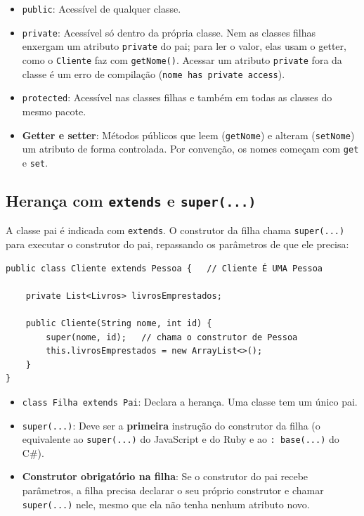 \begin{itemize}
    \item \texttt{public}: Acessível de qualquer classe.

    \item \texttt{private}: Acessível só dentro da própria classe. Nem as classes filhas
    enxergam um atributo \texttt{private} do pai; para ler o valor, elas usam o getter, como o
    \texttt{Cliente} faz com \texttt{getNome()}. Acessar um atributo \texttt{private} fora da
    classe é um erro de compilação (\texttt{nome has private access}).

    \item \texttt{protected}: Acessível nas classes filhas e também em todas as classes do mesmo
    pacote.

    \item \textbf{Getter e setter}: Métodos públicos que leem (\texttt{getNome}) e alteram
    (\texttt{setNome}) um atributo de forma controlada. Por convenção, os nomes começam com
    \texttt{get} e \texttt{set}.
\end{itemize}

\subsection{Herança com \texttt{extends} e \texttt{super(...)}}

A classe pai é indicada com \texttt{extends}. O construtor da filha chama \texttt{super(...)}
para executar o construtor do pai, repassando os parâmetros de que ele precisa:

\begin{lstlisting}[style=java]
public class Cliente extends Pessoa {   // Cliente É UMA Pessoa

    private List<Livros> livrosEmprestados;

    public Cliente(String nome, int id) {
        super(nome, id);   // chama o construtor de Pessoa
        this.livrosEmprestados = new ArrayList<>();
    }
}
\end{lstlisting}

\begin{itemize}
    \item \texttt{class Filha extends Pai}: Declara a herança. Uma classe tem um único pai.

    \item \texttt{super(...)}: Deve ser a \textbf{primeira} instrução do construtor da filha (o
    equivalente ao \texttt{super(...)} do JavaScript e do Ruby e ao \texttt{: base(...)} do C\#).

    \item \textbf{Construtor obrigatório na filha}: Se o construtor do pai recebe parâmetros, a
    filha precisa declarar o seu próprio construtor e chamar \texttt{super(...)} nele, mesmo que
    ela não tenha nenhum atributo novo.
\end{itemize}

